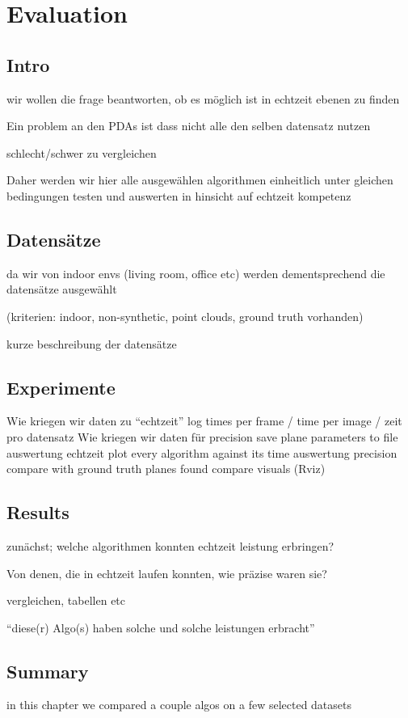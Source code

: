 \documentclass[main.tex]{subfiles}
\begin{document}
\chapter{Evaluation}

\section*{Intro}

wir wollen die frage beantworten, ob es möglich ist in echtzeit ebenen zu finden

Ein problem an den PDAs ist dass nicht alle den selben datensatz nutzen

schlecht/schwer zu vergleichen

Daher werden wir hier alle ausgewählen algorithmen einheitlich unter gleichen bedingungen testen und auswerten in hinsicht auf echtzeit kompetenz

\section{Datensätze}

da wir von indoor envs (living room, office etc) werden dementsprechend die datensätze ausgewählt

(kriterien: indoor, non-synthetic, point clouds, ground truth vorhanden)

kurze beschreibung der datensätze

\section{Experimente}

Wie kriegen wir daten zu “echtzeit”
log times per frame / time per image / zeit pro datensatz
Wie kriegen wir daten für precision
save plane parameters to file
auswertung echtzeit
plot every algorithm against its time
auswertung precision
compare with ground truth
planes found
compare visuals (Rviz)

\section{Results}

zunächst; welche algorithmen konnten echtzeit leistung erbringen?

Von denen, die in echtzeit laufen konnten, wie präzise waren sie?

vergleichen, tabellen etc

“diese(r) Algo(s) haben solche und solche leistungen erbracht”

\section{Summary}

in this chapter we compared a couple algos on a few selected datasets
\end{document}
